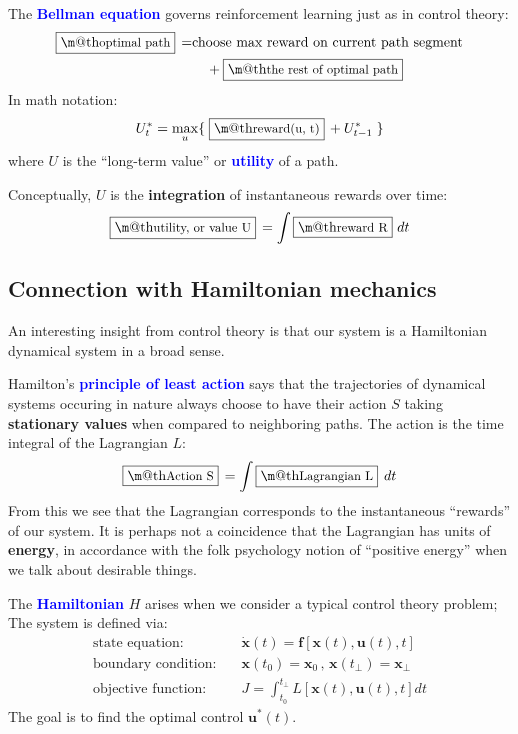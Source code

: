 \documentclass[orivec]{llncs}
\makeatletter
\newcommand{\emp}[1]{\textbf{\textcolor{blue}{#1}}}
\newcommand{\vect}[1]{\boldsymbol{#1}}
\renewcommand{\boxed}[1]{\fbox{\m@th$\displaystyle\scalebox{0.9}{#1}$} \,}
\makeatother
\begin{document}
The \emp{Bellman equation} governs reinforcement learning just as in control theory:
\begin{eqnarray}
\boxed{\mbox{optimal path}} = & \mbox{choose max reward on current path segment} \nonumber \\
& \quad + \boxed{\mbox{the rest of optimal path}}
\end{eqnarray}
In math notation:
\begin{equation}
U^*_t = \max_{u} \{ \; \boxed{\mbox{reward}(u, t)} + U^*_{t-1} \; \}
\end{equation}
where $U$ is the ``long-term value'' or \emp{utility} of a path.

Conceptually, $U$ is the \textbf{integration} of instantaneous rewards over time:
\begin{equation}
\boxed{\mbox{utility, or value} U} = \int \boxed{\mbox{reward} R} \,dt
\end{equation}

\subsection{Connection with Hamiltonian mechanics}

An interesting insight from control theory is that our system is a Hamiltonian dynamical system in a broad sense.

Hamilton's \emp{principle of least action} says that the trajectories of dynamical systems occuring in nature always choose to have their action $S$ taking \textbf{stationary values} when compared to neighboring paths.  The action is the time integral of the Lagrangian $L$:
\begin{equation}
\boxed{\mbox{Action} S} = \int \boxed{\mbox{Lagrangian} L} \; dt
\end{equation}
From this we see that the Lagrangian corresponds to the instantaneous ``rewards'' of our system.  It is perhaps not a coincidence that the Lagrangian has units of \textbf{energy}, in accordance with the folk psychology notion of ``positive energy'' when we talk about desirable things.

The \emp{Hamiltonian} $H$ arises when we consider a typical control theory problem;  The system is defined via:
\begin{eqnarray}
\mbox{state equation:} \quad & \dot{\vect{x}}(t) = \vect{f}[\vect{x}(t), \vect{u}(t), t] \\
\mbox{boundary condition:} \quad & \vect{x}(t_0) = \vect{x}_0 \,,\, \vect{x}(t_\bot) = \vect{x}_\bot \\
\mbox{objective function:} \quad & J = \int_{t_0}^{t_\bot} L[\vect{x}(t), \vect{u}(t), t] dt
\end{eqnarray}
The goal is to find the optimal control $\vect{u}^*(t)$.
\end{document}
